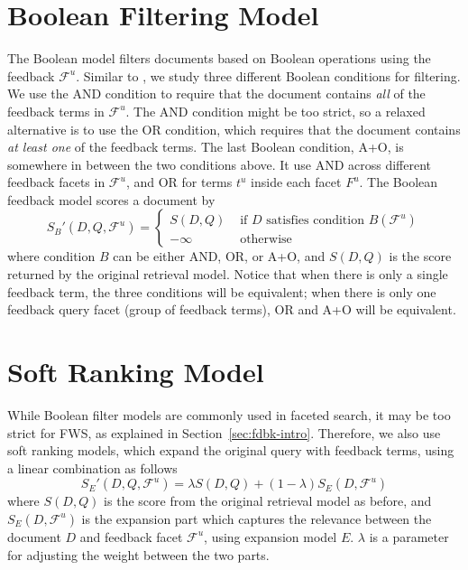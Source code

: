 \section{Boolean Filtering Model} \label{sec:fdbk-filter}
The Boolean model filters documents based on Boolean operations using the feedback $\mathcal{F}^u$. Similar to \citet{zhang2010interactive}, we study three different Boolean conditions for filtering. We use the AND condition to require that the document contains \emph{all} of the feedback terms in $\mathcal{F}^u$. The AND condition might be too strict, so a relaxed alternative is to use the OR condition, which requires that the document contains \emph{at least one} of the feedback terms. The last Boolean condition, A+O, is somewhere in between the two conditions above. It use AND across different feedback facets in $\mathcal{F}^u$, and OR for terms $t^u$ inside each facet $F^u$. The Boolean feedback model scores a document by
\begin{equation}
S_{B}'(D,Q,\mathcal{F}^u) = \left\{ \begin{array}{ll}
S(D,Q) &\mbox{ if $D$ satisfies condition $B(\mathcal{F}^u)$} \\
-\infty &\mbox{ otherwise}
\end{array} \right.
\end{equation}
where condition $B$ can be either AND, OR, or A+O, and $S(D,Q)$ is the score returned by the original retrieval model. Notice that when there is only a single feedback term, the three conditions will be equivalent; when there is only one feedback query facet (group of feedback terms), OR and A+O will be equivalent.

\section{Soft Ranking Model} \label{sec:fdbk-ranking}
While Boolean filter models are commonly used in faceted search, it may be too strict for FWS, as explained in Section~\ref{sec:fdbk-intro}. %
Therefore, we also use soft ranking models, which expand the original query with feedback terms, using a linear combination as follows
\begin{equation}
 S_E'(D,Q,\mathcal{F}^u) = \lambda S(D,Q) + (1-\lambda) S_E(D,\mathcal{F}^u)
\end{equation}
where $S(D,Q)$ is the score from the original retrieval model as before, and $S_E(D,\mathcal{F}^u)$ is the expansion part which captures the relevance between the document $D$ and feedback facet $\mathcal{F}^u$, using expansion model $E$. $\lambda$ is a parameter for adjusting the weight between the two parts.

